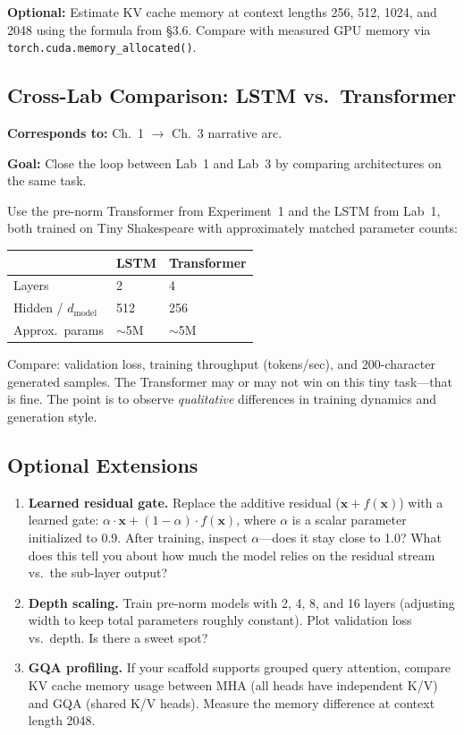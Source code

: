 \textbf{Optional:} Estimate KV cache memory at context lengths 256, 512, 1024, and 2048 using the formula from \S3.6. Compare with measured GPU memory via \texttt{torch.cuda.memory\_allocated()}.

\subsection*{Cross-Lab Comparison: LSTM vs.\ Transformer}

\textbf{Corresponds to:} Ch.~1 $\to$ Ch.~3 narrative arc.

\textbf{Goal:} Close the loop between Lab~1 and Lab~3 by comparing architectures on the same task.

Use the pre-norm Transformer from Experiment~1 and the LSTM from Lab~1, both trained on Tiny Shakespeare with approximately matched parameter counts:

\begin{center}
\begin{tabular}{lll}
\toprule
& LSTM & Transformer \\
\midrule
Layers & 2 & 4 \\
Hidden / $d_\text{model}$ & 512 & 256 \\
Approx.\ params & $\sim$5M & $\sim$5M \\
\bottomrule
\end{tabular}
\end{center}

Compare: validation loss, training throughput (tokens/sec), and 200-character generated samples. The Transformer may or may not win on this tiny task---that is fine. The point is to observe \emph{qualitative} differences in training dynamics and generation style.

\subsection*{Optional Extensions}

\begin{enumerate}
    \item \tierstretch{} \textbf{Learned residual gate.} Replace the additive residual ($\mathbf{x} + f(\mathbf{x})$) with a learned gate: $\alpha \cdot \mathbf{x} + (1 - \alpha) \cdot f(\mathbf{x})$, where $\alpha$ is a scalar parameter initialized to 0.9. After training, inspect $\alpha$---does it stay close to 1.0? What does this tell you about how much the model relies on the residual stream vs.\ the sub-layer output?
    \item \tierstretch{} \textbf{Depth scaling.} Train pre-norm models with 2, 4, 8, and 16 layers (adjusting width to keep total parameters roughly constant). Plot validation loss vs.\ depth. Is there a sweet spot?
    \item \tierstretch{} \textbf{GQA profiling.} If your scaffold supports grouped query attention, compare KV cache memory usage between MHA (all heads have independent K/V) and GQA (shared K/V heads). Measure the memory difference at context length 2048.
\end{enumerate}

